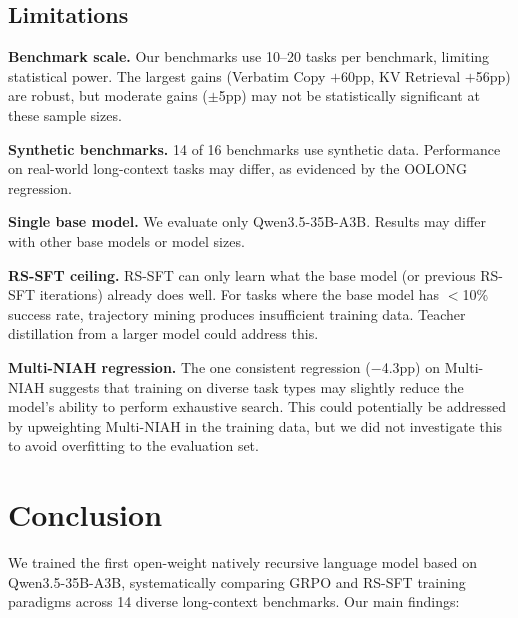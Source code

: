 \documentclass{article}
\begin{document}
\subsection{Limitations}

\textbf{Benchmark scale.} Our benchmarks use 10--20 tasks per benchmark, limiting statistical power. The largest gains (Verbatim Copy $+$60pp, KV Retrieval $+$56pp) are robust, but moderate gains ($\pm$5pp) may not be statistically significant at these sample sizes.

\textbf{Synthetic benchmarks.} 14 of 16 benchmarks use synthetic data. Performance on real-world long-context tasks may differ, as evidenced by the OOLONG regression.

\textbf{Single base model.} We evaluate only Qwen3.5-35B-A3B. Results may differ with other base models or model sizes.

\textbf{RS-SFT ceiling.} RS-SFT can only learn what the base model (or previous RS-SFT iterations) already does well. For tasks where the base model has $<$10\% success rate, trajectory mining produces insufficient training data. Teacher distillation from a larger model could address this.

\textbf{Multi-NIAH regression.} The one consistent regression ($-$4.3pp) on Multi-NIAH suggests that training on diverse task types may slightly reduce the model's ability to perform exhaustive search. This could potentially be addressed by upweighting Multi-NIAH in the training data, but we did not investigate this to avoid overfitting to the evaluation set.

\section{Conclusion}
\label{sec:conclusion}

We trained the first open-weight natively recursive language model based on Qwen3.5-35B-A3B, systematically comparing GRPO and RS-SFT training paradigms across 14 diverse long-context benchmarks. Our main findings:
\end{document}
